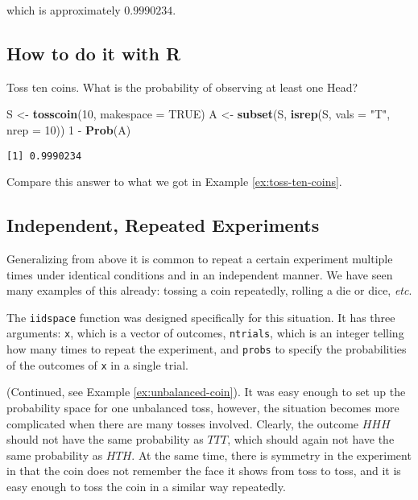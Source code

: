 \documentclass[]{book}
\newenvironment{Shaded}{\begin{snugshade}}{\end{snugshade}}
\newcommand{\KeywordTok}[1]{\textcolor[rgb]{0.13,0.29,0.53}{\textbf{{#1}}}}
\newcommand{\DataTypeTok}[1]{\textcolor[rgb]{0.13,0.29,0.53}{{#1}}}
\newcommand{\DecValTok}[1]{\textcolor[rgb]{0.00,0.00,0.81}{{#1}}}
\newcommand{\StringTok}[1]{\textcolor[rgb]{0.31,0.60,0.02}{{#1}}}
\newcommand{\OtherTok}[1]{\textcolor[rgb]{0.56,0.35,0.01}{{#1}}}
\newcommand{\NormalTok}[1]{{#1}}
\numberwithin{equation}{chapter}
\numberwithin{figure}{chapter}
\theoremstyle{plain}
\theoremstyle{definition}
\theoremstyle{remark}
\theoremstyle{definition}
\theoremstyle{definition}
\theoremstyle{remark}
\let\BeginKnitrBlock\begin \let\EndKnitrBlock\end
\begin{document}
which is approximately \(0.9990234\).

\subsection{How to do it with R}\label{how-to-do-it-with-r-17}

\BeginKnitrBlock{example}
\protect\hypertarget{ex:unnamed-chunk-172}{}{\label{ex:unnamed-chunk-172}}Toss
ten coins. What is the probability of observing at least one Head?
\EndKnitrBlock{example}

\begin{Shaded}
\begin{Highlighting}[]
\NormalTok{S <-}\StringTok{ }\KeywordTok{tosscoin}\NormalTok{(}\DecValTok{10}\NormalTok{, }\DataTypeTok{makespace =} \OtherTok{TRUE}\NormalTok{)}
\NormalTok{A <-}\StringTok{ }\KeywordTok{subset}\NormalTok{(S, }\KeywordTok{isrep}\NormalTok{(S, }\DataTypeTok{vals =} \StringTok{"T"}\NormalTok{, }\DataTypeTok{nrep =} \DecValTok{10}\NormalTok{))}
\DecValTok{1} \NormalTok{-}\StringTok{ }\KeywordTok{Prob}\NormalTok{(A)}
\end{Highlighting}
\end{Shaded}

\begin{verbatim}
[1] 0.9990234
\end{verbatim}

Compare this answer to what we got in Example \ref{ex:toss-ten-coins}.

\subsection{Independent, Repeated
Experiments}\label{independent-repeated-experiments}

Generalizing from above it is common to repeat a certain experiment
multiple times under identical conditions and in an independent manner.
We have seen many examples of this already: tossing a coin repeatedly,
rolling a die or dice, \emph{etc}.

The \texttt{iidspace} function was designed specifically for this
situation. It has three arguments: \texttt{x}, which is a vector of
outcomes, \texttt{ntrials}, which is an integer telling how many times
to repeat the experiment, and \texttt{probs} to specify the
probabilities of the outcomes of \texttt{x} in a single trial.

\bigskip

\BeginKnitrBlock{example}[An unbalanced coin]
\protect\hypertarget{ex:unnamed-chunk-174}{}{\label{ex:unnamed-chunk-174}
\iffalse (An unbalanced coin) \fi }(Continued, see Example
\ref{ex:unbalanced-coin}). It was easy enough to set up the probability
space for one unbalanced toss, however, the situation becomes more
complicated when there are many tosses involved. Clearly, the outcome
\(HHH\) should not have the same probability as \(TTT\), which should
again not have the same probability as \(HTH\). At the same time, there
is symmetry in the experiment in that the coin does not remember the
face it shows from toss to toss, and it is easy enough to toss the coin
in a similar way repeatedly.
\EndKnitrBlock{example}
\end{document}
